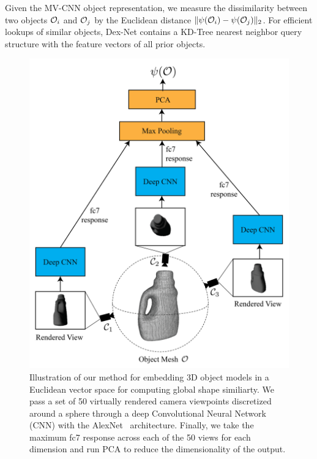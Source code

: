 Given the MV-CNN object representation, we measure the dissimilarity between two objects $\mathcal{O}_i$ and $\mathcal{O}_j$ by the Euclidean distance $\| \psi(\mathcal{O}_i) - \psi(\mathcal{O}_j) \|_2$.
For efficient lookups of similar objects, Dex-Net contains a KD-Tree nearest neighbor query structure with the feature vectors of all prior objects.


\begin{figure}[t!]
\centering
\includegraphics[scale=0.3]{figures/illustrations/cnn_model.png}
\caption{Illustration of our method for embedding 3D object models in a Euclidean vector space for computing global shape similiarty. We pass a set of 50 virtually rendered camera viewpoints discretized around a sphere through a deep Convolutional Neural Network (CNN) with the AlexNet~\cite{krizhevsky2012imagenet} architecture. Finally, we take the maximum fc7 response across each of the 50 views for each dimension and run PCA to reduce the dimensionality of the output.}
\vspace*{-15pt}
\end{figure}
